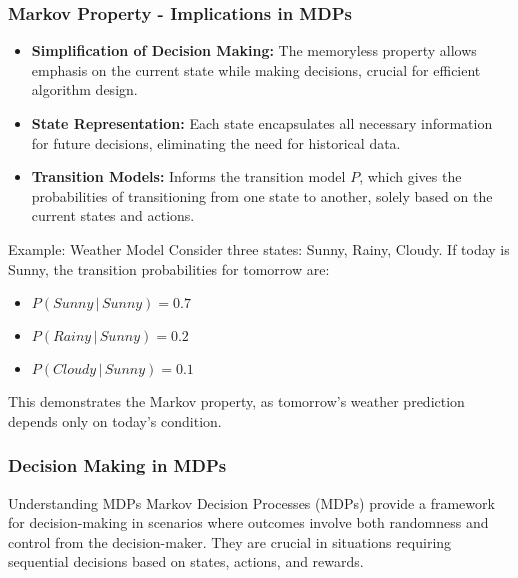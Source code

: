 \documentclass[aspectratio=169]{beamer}
\begin{document}
\begin{frame}[fragile]
  \frametitle{Markov Property - Implications in MDPs}
  \begin{itemize}
    \item \textbf{Simplification of Decision Making:} 
    The memoryless property allows emphasis on the current state while making decisions, crucial for efficient algorithm design.
  
    \item \textbf{State Representation:} 
    Each state encapsulates all necessary information for future decisions, eliminating the need for historical data.

    \item \textbf{Transition Models:} 
    Informs the transition model \( P \), which gives the probabilities of transitioning from one state to another, solely based on the current states and actions.
  \end{itemize}

  \begin{block}{Example: Weather Model}
    Consider three states: Sunny, Rainy, Cloudy. If today is Sunny, the transition probabilities for tomorrow are:
    \begin{itemize}
      \item \( P(Sunny \,|\, Sunny) = 0.7 \)
      \item \( P(Rainy \,|\, Sunny) = 0.2 \)
      \item \( P(Cloudy \,|\, Sunny) = 0.1 \)
    \end{itemize}
    This demonstrates the Markov property, as tomorrow's weather prediction depends only on today's condition.
  \end{block}
\end{frame}

\begin{frame}[fragile]
    \frametitle{Decision Making in MDPs}
    \begin{block}{Understanding MDPs}
        Markov Decision Processes (MDPs) provide a framework for decision-making in scenarios where outcomes involve both randomness and control from the decision-maker. They are crucial in situations requiring sequential decisions based on states, actions, and rewards.
    \end{block}
\end{frame}
\end{document}
